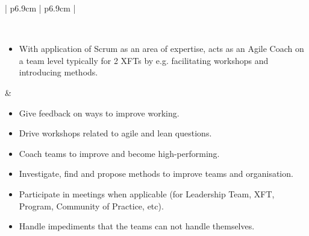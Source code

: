 \begin{table}[h]
\begin{tabularx}{\textwidth}{ | p{6.9cm} | p{6.9cm} | }
   \\ \hline
   
   
   \\ \hline
   
   \begin{itemize}[label={}, leftmargin=*, topsep=0pt, itemsep=0pt, partopsep=0pt]
     \item With application of Scrum as an area of expertise, acts as an Agile Coach on a team level typically for 2 \acp{XFT} by e.g. facilitating workshops and introducing methods.
   \end{itemize} & 
   
   \begin{itemize}[label={}, leftmargin=*, topsep=0pt, itemsep=0pt, partopsep=0pt]
     \item Give feedback on ways to improve working.
     \item Drive workshops related to agile and lean questions.
     \item Coach teams to improve and become high-performing.
     \item Investigate, find and propose methods to improve teams and organisation.
     \item Participate in meetings when applicable (for Leadership Team, XFT, Program, Community of Practice, etc).
     \item Handle impediments that the teams can not handle themselves.
   \end{itemize} 
   
   \\ \hline
   
      \end{tabularx}
\end{table}

